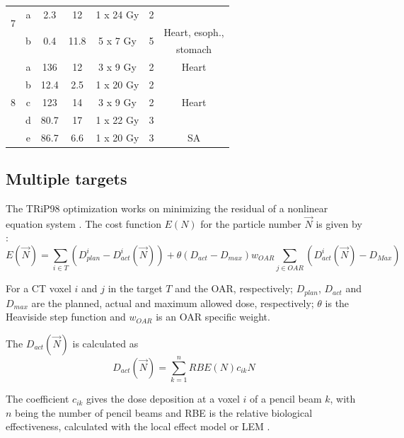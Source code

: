 \begin{table}[H]
\begin{tabular}{c|c|c|c|c|c|c}
		 \hline
		 \multirow{2}{*}{7} & a & 2.3 & 12  & 1 x 24 Gy & 2 &\\
		 & \multirow{2}{*}{b} & \multirow{2}{*}{0.4} & \multirow{2}{*}{11.8}  & \multirow{2}{*}{5 x 7 Gy} & \multirow{2}{*}{5} & Heart, esoph., \\
		 & & & & & & stomach \\
		 \hline
		 \multirow{5}{*}{8} & a & 136 & 12  & 3 x 9 Gy & 2 & Heart\\
		  & b & 12.4 & 2.5  & 1 x 20 Gy & 2 &\\
		  & c & 123 & 14  & 3 x 9 Gy & 2  &Heart \\
		 & d & 80.7 & 17  & 1 x 22 Gy & 3  &\\
		 & e & 86.7 & 6.6  & 1 x 20 Gy & 3 & SA \\
		\hline\hline
	\end{tabular}
	\label{tab:patdata2}
\end{table}


\newpage

\subsection{Multiple targets}

The TRiP98 optimization works on minimizing the residual of a nonlinear equation system \cite{Kraemer2000a}. The cost function $E(N)$ for the particle number $\vec{N}$ is given by  :
\begin{equation}
\label{eq-costFunc}
 E(\vec{N}) = \sum_{i\in T} \left( D_{plan}^{i} - D_{act}^{i}(\vec{N})\right) +  \theta(D_{act}-D_{max})w_{OAR}\sum_{j\in OAR} \left( D_{act}^{i}(\vec{N}) - D_{Max} \right)
\end{equation}

For a CT voxel $i$ and $j$ in the target $T$ and the OAR, respectively; $ D_{plan}$, $D_{act}$ and $D_{max}$ are the planned, actual and maximum allowed dose, respectively; $\theta$ is the 
Heaviside step function and $w_{OAR}$ is an OAR specific weight.

The $D_{act}(\vec{N})$ is calculated as
\begin{equation}
 D_{act}(\vec{N}) = \sum_{k=1}^n RBE(N) c_{ik}N 
\end{equation}

The coefficient $c_{ik}$ gives the dose deposition at a voxel $i$ of a pencil beam $k$, 
with $n$ being the number of pencil beams and RBE is the relative biological effectiveness, calculated with the local effect model or LEM \cite{Elsaesser2010} . 


